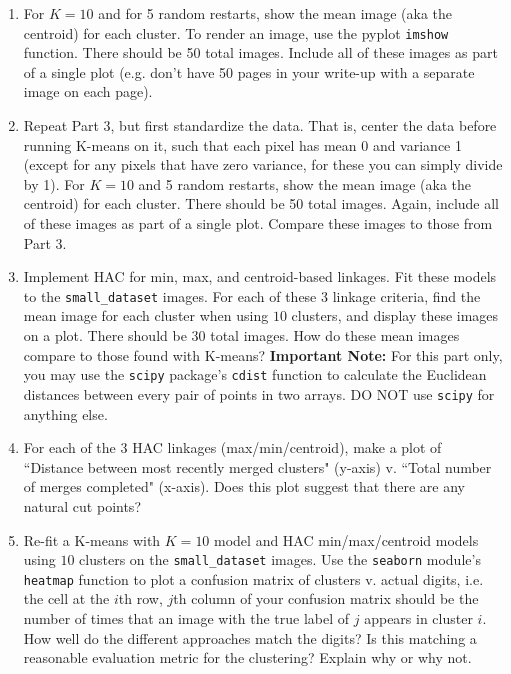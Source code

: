 \documentclass[submit]{harvardml}
\begin{document}
\begin{problem}
\begin{enumerate}
\item For $K=10$ and for 5 random restarts, show the mean
  image (aka the centroid) for each cluster.
  To render an image, use the pyplot
  \texttt{imshow} function. There should be 50 total images. Include all of these images
  as part of a single plot (e.g. don't have 50 pages in your write-up with a
  separate image on each page).

\item Repeat Part 3, but first standardize the data. That is, center
  the data before running K-means on it, such that each pixel has mean 0 and variance 1 (except
  for any pixels that have zero variance, for these you can simply
  divide by 1). For $K=10$ and 5 random restarts, show the mean image
  (aka the centroid) for each cluster. There should be 50 total
  images. Again, include all of these images as part of a single plot.
  Compare these images to those from Part 3.

\item Implement HAC for min, max, and centroid-based linkages. Fit these models to the \texttt{small\_dataset} images. 
  For each of these 3 linkage criteria, find the mean image for each cluster when using $10$ clusters, and display these images on a plot. There should be 30 total images.
  How do these mean images compare to those found with K-means? \textbf{Important Note:} For this part only, you may use the \texttt{scipy} package's \texttt{cdist} function to calculate the Euclidean distances between every pair of points in two arrays. DO NOT use \texttt{scipy} for anything else. 

\item For each of the 3 HAC linkages (max/min/centroid), make a plot of
  ``Distance between most recently merged clusters" (y-axis) v. ``Total number of merges completed" (x-axis).
  Does this plot suggest that there are any  natural cut points? 

\item Re-fit a K-means with $K = 10$ model and HAC min/max/centroid models using $10$ clusters on the \texttt{small\_dataset} images. Use the \texttt{seaborn} module's \texttt{heatmap} function to plot a confusion matrix of clusters v. actual digits, i.e. the cell at the $i$th row, $j$th column of your confusion matrix should be the number of times that an image with the true label of $j$ appears in cluster $i$. How well do the different approaches match the digits? Is this matching a reasonable evaluation metric for the clustering?  Explain why or why not.  
  
\end{enumerate}

\end{problem}
\end{document}
